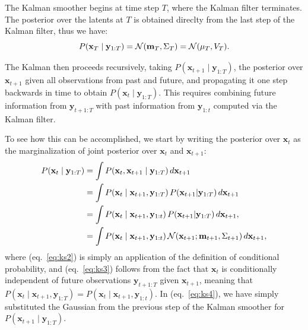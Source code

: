 \documentclass[10pt]{article}
\newcommand{\vx}{\mathbf{x}}
\newcommand{\vy}{\mathbf{y}}
\newcommand{\vm}{\mathbf{m}}
\begin{document}
The Kalman smoother begins at time step $T$, where the Kalman filter
terminates.  The posterior over the latents at $T$ is obtained
direclty from the last step of the Kalman filter, thus we have:
\begin{equation}
 P(\vx_T \mid \vy_{1:T}) = \Nrm(\vm_T, \Sigma_T) = \Nrm(\mu_T, V_T).
\end{equation}

The Kalman then proceeds recursively, taking
$P(\vx_{t+1} \mid \vy_{1:T})$, the posterior over $\vx_{t+1}$ given
all observations from past and future, and propagating it one step
backwards in time to obtain $P(\vx_t \mid \vy_{1:T})$.  This requires
combining future information from $\vy_{t+1:T}$ with past information
from $\vy_{1:t}$ computed via the Kalman filter.

To see how this can be accomplished, we start by writing the posterior
over $\vx_t$ as the marginalization of joint posterior over $\vx_t$
and $\vx_{t+1}$:
\begin{align}
  P(\vx_t \mid \vy_{1:T}) &=  \int P(\vx_t,\vx_{t+1} \mid \vy_{1:T})\,
       d\vx_{t+1} \label{eq:ks1}
  \\
                        &= \int P(\vx_t \mid \vx_{t+1}, \vy_{1:T})\,
                          P(\vx_{t+1} | \vy_{1:T}) \, d\vx_{t+1}
\label{eq:ks2}
  \\
                        &= \int P(\vx_t \mid \vx_{t+1}, \vy_{1:t})\,
                          P(\vx_{t+1} | \vy_{1:T}) \, d\vx_{t+1},
                          \label{eq:ks3} \\
  & =  \int P(\vx_t \mid \vx_{t+1}, \vy_{1:t})\,
                          \Nrm(\vx_{t+1}; \vm_{t+1}, \Sigma_{t+1}) \,
    d\vx_{t+1},
             \label{eq:ks4}
\end{align}
where (eq.~\ref{eq:ks2}) is simply an application of the definition of
conditional probability, and (eq.~\ref{eq:ks3}) follows from the fact
that $\vx_t$ is conditionally independent of future observations
$\vy_{t+1:T}$ given $\vx_{t+1}$, meaning that
$P(\vx_t \mid \vx_{t+1}, \vy_{1:T}) = P(\vx_t \mid \vx_{t+1},
\vy_{1:t})$.  In  (eq.~\ref{eq:ks4}), we have simply substituted the
Gaussian from the previous step of the Kalman smoother for
$P(\vx_{t+1} \mid \vy_{1:T})$. 
\end{document}

